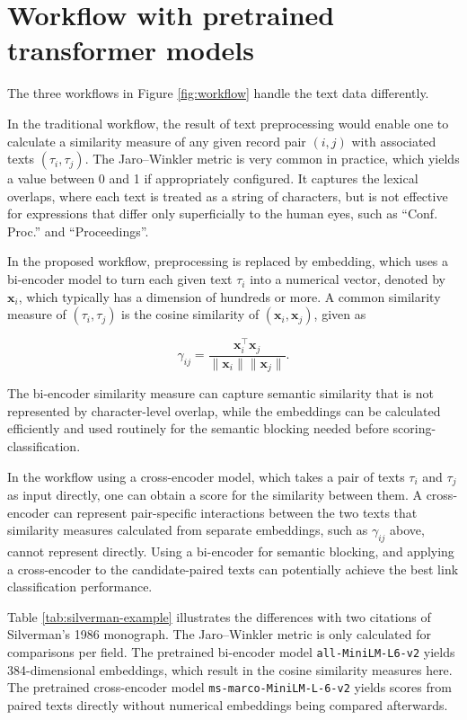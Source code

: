 \section{Workflow with pretrained transformer models}
\label{sec:pretrained}

The three workflows in Figure \ref{fig:workflow} handle the text data differently.

In the traditional workflow, the result of text preprocessing would enable one to calculate
a similarity measure of any given record pair $(i,j)$ with associated texts
$(\tau_i,\tau_j)$. The Jaro--Winkler metric
\citep{jaro1989advances,winkler1990string} is very common in practice, which yields a
value between 0 and 1 if appropriately configured. It captures the lexical overlaps, where
each text is treated as a string of characters, but is not effective for expressions that differ
only superficially to the human eyes, such as ``Conf. Proc.'' and ``Proceedings''.

In the proposed workflow, preprocessing is replaced by embedding, which uses a bi-encoder
model to turn each given text $\tau_i$ into a numerical vector, denoted by $\mathbf{x}_i$,
which typically has a dimension of hundreds or more. A common similarity measure of
$(\tau_i,\tau_j)$ is the cosine similarity of $(\mathbf{x}_i,\mathbf{x}_j)$, given as

\begin{equation}
\gamma_{ij}
=
\frac{\mathbf{x}_i^\top \mathbf{x}_j}
{\lVert \mathbf{x}_i\rVert \lVert \mathbf{x}_j\rVert}.
\end{equation}

The bi-encoder similarity measure can capture semantic similarity that is not
represented by character-level overlap, while the embeddings can be calculated
efficiently and used routinely for the semantic blocking needed before
scoring-classification.

In the workflow using a cross-encoder model, which takes a pair of texts $\tau_i$ and
$\tau_j$ as input directly, one can obtain a score for the similarity between them. A cross-encoder can represent pair-specific interactions between the two texts
that similarity measures calculated from separate embeddings, such as
$\gamma_{ij}$ above, cannot represent directly. Using a
bi-encoder for semantic blocking, and applying a cross-encoder to the candidate-paired
texts can potentially achieve the best link classification performance.

Table \ref{tab:silverman-example} illustrates the differences with two citations of
Silverman's 1986 monograph. The Jaro--Winkler metric is only calculated for comparisons
per field. The pretrained bi-encoder model \texttt{all-MiniLM-L6-v2}
\citep{reimers2019sentence} yields 384-dimensional embeddings, which result in the cosine
similarity measures here. The pretrained cross-encoder model
\texttt{ms-marco-MiniLM-L-6-v2} \citep{wang2020minilm} yields scores from paired texts
directly without numerical embeddings being compared afterwards.

